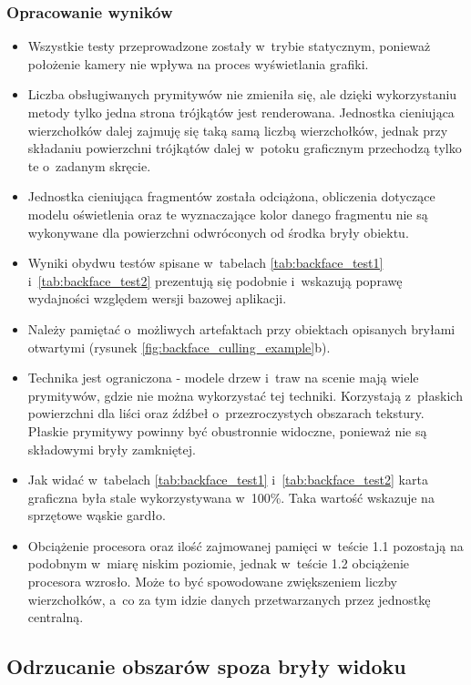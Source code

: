 \documentclass[a4paper,twoside,12pt]{book}
\begin{document}
\subsubsection{Opracowanie wyników}
\begin{itemize}
    \item Wszystkie testy przeprowadzone zostały w~trybie statycznym, ponieważ położenie kamery nie wpływa na proces wyświetlania grafiki.
    \item Liczba obsługiwanych prymitywów nie zmieniła się, ale dzięki wykorzystaniu metody tylko jedna strona trójkątów jest renderowana. Jednostka cieniująca wierzchołków dalej zajmuję się taką samą liczbą wierzchołków, jednak przy składaniu powierzchni trójkątów dalej w~potoku graficznym przechodzą tylko te o~zadanym skręcie.
    \item Jednostka cieniująca fragmentów została odciążona, obliczenia dotyczące modelu oświetlenia oraz te wyznaczające kolor danego fragmentu nie są wykonywane dla powierzchni odwróconych od środka bryły obiektu.
    \item Wyniki obydwu testów spisane w~tabelach \ref{tab:backface_test1} i~\ref{tab:backface_test2} prezentują się podobnie i~wskazują poprawę wydajności względem wersji bazowej aplikacji.
    \item Należy pamiętać o~możliwych artefaktach przy obiektach opisanych bryłami otwartymi (rysunek \ref{fig:backface_culling_example}b).
    \item Technika jest ograniczona - modele drzew i~traw na scenie mają wiele prymitywów, gdzie nie można wykorzystać tej techniki. Korzystają z~płaskich powierzchni dla liści oraz źdźbeł o~przezroczystych obszarach tekstury. Płaskie prymitywy powinny być obustronnie widoczne, ponieważ nie są składowymi bryły zamkniętej.
    \item Jak widać w~tabelach  \ref{tab:backface_test1} i~\ref{tab:backface_test2} karta graficzna była stale wykorzystywana w~100\%. Taka wartość wskazuje na sprzętowe wąskie gardło.
    \item Obciążenie procesora oraz ilość zajmowanej pamięci w~teście 1.1 pozostają na podobnym w~miarę niskim poziomie, jednak w~teście 1.2 obciążenie procesora wzrosło. Może to być spowodowane zwiększeniem liczby wierzchołków, a~co za tym idzie danych przetwarzanych przez jednostkę centralną.
\end{itemize}

\newpage

\subsection{Odrzucanie obszarów spoza bryły widoku}
\end{document}
